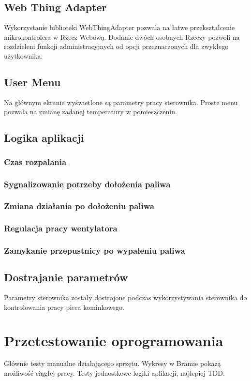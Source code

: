 \documentclass[11pt]{report}
\begin{document}
 
 \section{Web Thing Adapter}
 Wykorzystanie biblioteki WebThingAdapter pozwala na łatwe przekształcenie mikrokontrolera w Rzecz Webową.
 Dodanie dwóch osobnych Rzeczy pozwoli na rozdzieleni funkcji administracyjnych od opcji przeznaczonych dla zwykłego użytkownika.
 
 \section{User Menu}
 Na głównym ekranie wyświetlone są parametry pracy sterownika.
 Proste menu pozwala na zmianę zadanej temperatury w pomieszczeniu.
 
 \section{Logika aplikacji}
 \subsection{Czas rozpalania}
 \subsection{Sygnalizowanie potrzeby dołożenia paliwa}
 \subsection{Zmiana działania po dołożeniu paliwa}
 \subsection{Regulacja pracy wentylatora}
 \subsection{Zamykanie przepustnicy po wypaleniu paliwa}
 
 \section{Dostrajanie parametrów}
 Parametry sterownika zostały dostrojone podczas wykorzystywania sterownika do kontrolowania pracy pieca kominkowego.
 
 
 \chapter{Przetestowanie oprogramowania}
 Głównie testy manualne działającego sprzętu.
 Wykresy w Bramie pokażą możliwość ciągłej pracy.
 Testy jednostkowe logiki aplikacji, najlepiej TDD.
\end{document}
